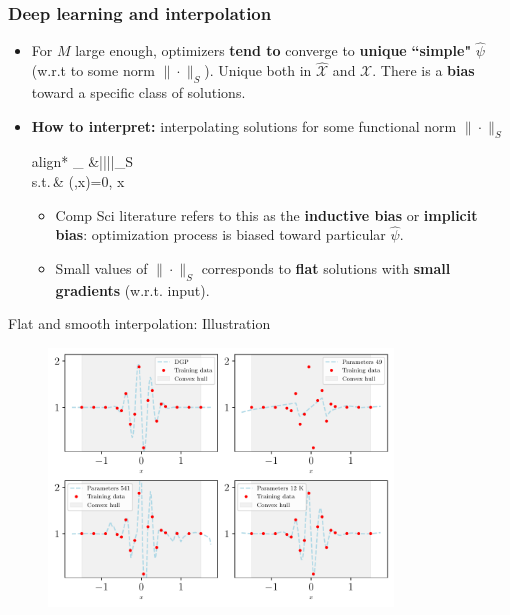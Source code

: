 \documentclass[aspectratio=169,10pt]{beamer}
\newcommand{\emphcolor}[1]{\textbf{\textcolor{emphcolorval}{#1}}}
\newcommand{\Xdom}{\mathcal{X}}
\newcommand{\Xtrain}{\hat{\mathcal{X}}}
\newcommand{\st}{\textrm{s.t.}\,}
\begin{document}
\begin{frame}
	\frametitle{Deep learning and interpolation}
	\begin{itemize}
		\item For $M$ large enough, optimizers \emphcolor{tend to} converge to \emphcolor{unique} \emphcolor{``simple"}  $\hat{\psi}$ (w.r.t to some norm $\|\cdot\|_S$). Unique both in $\Xtrain$ and $\Xdom$. There is a \emphcolor{bias} toward a specific class of solutions.
		\medskip
		\item \emphcolor{How to interpret:} interpolating solutions for some functional norm $\|\cdot\|_S$
		\begin{empheq}[box=\tcbhighmath]{align*}
			\min_{\hat{\psi}\in {}} &||\hat{\psi}||_S\\
			\st & \ell(\hat{\psi},x)=0,\quad {} x \in \Xtrain
		\end{empheq}
		\vspace{-0.1in}
		
		\begin{itemize}
			\item Comp Sci literature refers to this as the \emphcolor{inductive bias} or \emphcolor{implicit bias}: optimization process is biased toward particular $\hat{\psi}$.\smallskip
			\item Small values of $\|\cdot\|_S$ corresponds to \emphcolor{flat} solutions with \emphcolor{small gradients} (w.r.t. input).
			\smallskip
		\end{itemize}
	\end{itemize}
\end{frame}


\begin{frame}{Flat and smooth interpolation:  Illustration}
	\begin{figure}[h!]
		\begin{center}
			\includegraphics[height=2.7in]{./figures/fourplots_example_reg.pdf}
		\end{center}
	\end{figure}

\end{frame}
\end{document}
